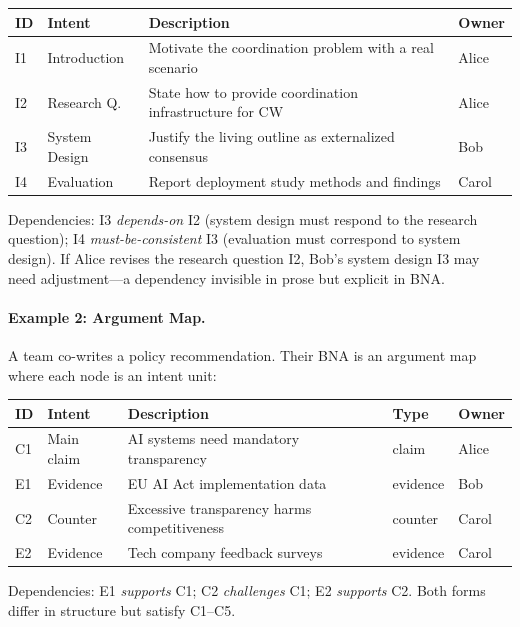 \begin{table}[h]
\small
\begin{tabular}{@{}llp{5.5cm}l@{}}
\toprule
\textbf{ID} & \textbf{Intent} & \textbf{Description} & \textbf{Owner} \\
\midrule
I1 & Introduction & Motivate the coordination problem with a real scenario & Alice \\
I2 & Research Q. & State how to provide coordination infrastructure for CW & Alice \\
I3 & System Design & Justify the living outline as externalized consensus & Bob \\
I4 & Evaluation & Report deployment study methods and findings & Carol \\
\bottomrule
\end{tabular}
\end{table}

\noindent Dependencies: I3 \emph{depends-on} I2 (system design must respond to the research question); I4 \emph{must-be-consistent} I3 (evaluation must correspond to system design). If Alice revises the research question I2, Bob's system design I3 may need adjustment---a dependency invisible in prose but explicit in BNA.

\paragraph{Example 2: Argument Map.} A team co-writes a policy recommendation. Their BNA is an argument map where each node is an intent unit:

\begin{table}[h]
\small
\begin{tabular}{@{}llp{4.5cm}ll@{}}
\toprule
\textbf{ID} & \textbf{Intent} & \textbf{Description} & \textbf{Type} & \textbf{Owner} \\
\midrule
C1 & Main claim & AI systems need mandatory transparency & claim & Alice \\
E1 & Evidence & EU AI Act implementation data & evidence & Bob \\
C2 & Counter & Excessive transparency harms competitiveness & counter & Carol \\
E2 & Evidence & Tech company feedback surveys & evidence & Carol \\
\bottomrule
\end{tabular}
\end{table}

\noindent Dependencies: E1 \emph{supports} C1; C2 \emph{challenges} C1; E2 \emph{supports} C2. Both forms differ in structure but satisfy C1--C5.


